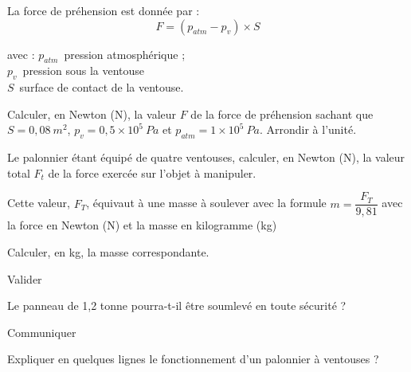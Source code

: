 \documentclass[11pt,a4paper]{article}
\newcommand{\cadreblanc}[1]{%
\medskip\framebox[\linewidth][c]{%
\rule{0mm}{#1mm}}\par
\medskip}
\begin{document}
\begin{enumerate}

\noindent%
\begin{minipage}{.56\textwidth}%

  \item La force de préhension est donnée par : \Large{$$F=(p_{atm}-p_v)\times S$$}
  
  

\end{minipage}%
\hfill
\begin{minipage}{.35\textwidth}%
 avec : $p_{atm}$~pression atmosphérique ;\\ $p_v$~pression sous la ventouse \\ $S$~surface de contact de la ventouse.
\end{minipage}%
\vspace{3mm}
Calculer, en Newton (N), la valeur  $F$ de la force de préhension sachant que $S = 0,08~m^2$, $p_v=0,5\times10^5~Pa$ et $p_{atm}= 1 \times10^5~Pa$. Arrondir à l'unité. 

\cadreblanc{25}

\item Le palonnier étant équipé de quatre ventouses, calculer, en Newton (N), la valeur total $F_t$ de la force exercée sur l'objet à manipuler. 

\cadreblanc{10}

\item Cette valeur, $F_T$, équivaut à une masse à soulever avec la formule $m=\dfrac{F_T}{9,81}$ avec la force en Newton (N) et la masse en kilogramme (kg) 

Calculer, en kg, la masse correspondante. 

\cadreblanc{15}



\end{enumerate}

 Valider 

Le panneau de 1,2 tonne pourra-t-il être soumlevé en toute sécurité ? 

\cadreblanc{15}

 Communiquer 

Expliquer en quelques lignes le fonctionnement d'un palonnier à ventouses ? 

\cadreblanc{25}

  \vfill 
  
\end{document}
